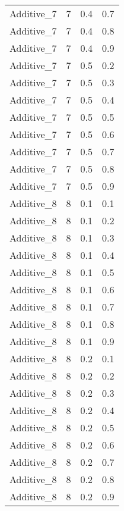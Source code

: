 \documentclass{article}
\begin{document}
\begin{longtable}[H]{lrrr}
 Additive\_7 &       7 &   0.4 &            0.7 \\
 Additive\_7 &       7 &   0.4 &            0.8 \\
 Additive\_7 &       7 &   0.4 &            0.9 \\
 Additive\_7 &       7 &   0.5 &            0.2 \\
 Additive\_7 &       7 &   0.5 &            0.3 \\
 Additive\_7 &       7 &   0.5 &            0.4 \\
 Additive\_7 &       7 &   0.5 &            0.5 \\
 Additive\_7 &       7 &   0.5 &            0.6 \\
 Additive\_7 &       7 &   0.5 &            0.7 \\
 Additive\_7 &       7 &   0.5 &            0.8 \\
 Additive\_7 &       7 &   0.5 &            0.9 \\
 Additive\_8 &       8 &   0.1 &            0.1 \\
 Additive\_8 &       8 &   0.1 &            0.2 \\
 Additive\_8 &       8 &   0.1 &            0.3 \\
 Additive\_8 &       8 &   0.1 &            0.4 \\
 Additive\_8 &       8 &   0.1 &            0.5 \\
 Additive\_8 &       8 &   0.1 &            0.6 \\
 Additive\_8 &       8 &   0.1 &            0.7 \\
 Additive\_8 &       8 &   0.1 &            0.8 \\
 Additive\_8 &       8 &   0.1 &            0.9 \\
 Additive\_8 &       8 &   0.2 &            0.1 \\
 Additive\_8 &       8 &   0.2 &            0.2 \\
 Additive\_8 &       8 &   0.2 &            0.3 \\
 Additive\_8 &       8 &   0.2 &            0.4 \\
 Additive\_8 &       8 &   0.2 &            0.5 \\
 Additive\_8 &       8 &   0.2 &            0.6 \\
 Additive\_8 &       8 &   0.2 &            0.7 \\
 Additive\_8 &       8 &   0.2 &            0.8 \\
 Additive\_8 &       8 &   0.2 &            0.9 \\

\end{longtable}
\end{document}
